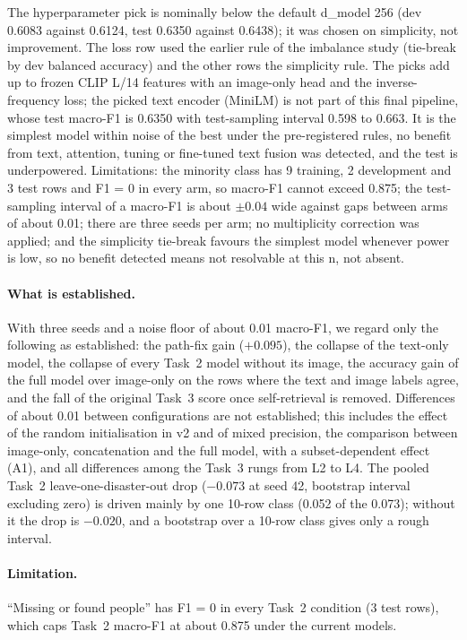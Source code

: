 The hyperparameter pick is nominally below the default d\_model 256 (dev 0.6083 against 0.6124, test 0.6350 against 0.6438); it was chosen on simplicity, not improvement.
The loss row used the earlier rule of the imbalance study (tie-break by dev balanced accuracy) and the other rows the simplicity rule.
The picks add up to frozen CLIP L/14 features with an image-only head and the inverse-frequency loss; the picked text encoder (MiniLM) is not part of this final pipeline, whose test macro-F1 is 0.6350 with test-sampling interval 0.598 to 0.663.
It is the simplest model within noise of the best under the pre-registered rules, no benefit from text, attention, tuning or fine-tuned text fusion was detected, and the test is underpowered.
Limitations: the minority class has 9 training, 2 development and 3 test rows and F1 = 0 in every arm, so macro-F1 cannot exceed 0.875; the test-sampling interval of a macro-F1 is about $\pm 0.04$ wide against gaps between arms of about 0.01; there are three seeds per arm; no multiplicity correction was applied; and the simplicity tie-break favours the simplest model whenever power is low, so no benefit detected means not resolvable at this n, not absent.
\paragraph{What is established.}
With three seeds and a noise floor of about 0.01 macro-F1, we regard only the following as established: the path-fix gain ($+0.095$), the collapse of the text-only model, the collapse of every Task~2 model without its image, the accuracy gain of the full model over image-only on the rows where the text and image labels agree, and the fall of the original Task~3 score once self-retrieval is removed.
Differences of about 0.01 between configurations are not established; this includes the effect of the random initialisation in v2 and of mixed precision, the comparison between image-only, concatenation and the full model, with a subset-dependent effect (A1), and all differences among the Task~3 rungs from L2 to L4.
The pooled Task~2 leave-one-disaster-out drop ($-0.073$ at seed 42, bootstrap interval excluding zero) is driven mainly by one 10-row class (0.052 of the 0.073); without it the drop is $-0.020$, and a bootstrap over a 10-row class gives only a rough interval.
\paragraph{Limitation.}
``Missing or found people'' has F1 = 0 in every Task~2 condition (3 test rows), which caps Task~2 macro-F1 at about 0.875 under the current models.
